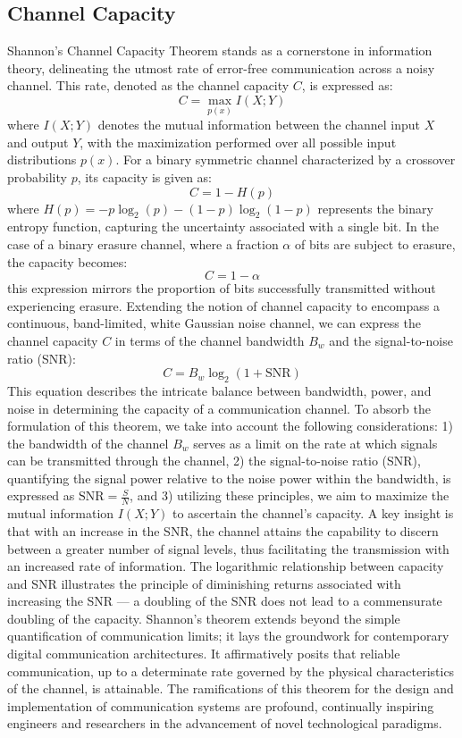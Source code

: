 \documentclass[journal,12pt,onecolumn,draftclsnofoot,]{IEEEtran}
\begin{document}
	\subsection{Channel Capacity}
	Shannon's Channel Capacity Theorem stands as a cornerstone in information theory, delineating the utmost rate of error-free communication across a noisy channel. This rate, denoted as the channel capacity \(C\), is expressed as:
	\[ C = \max_{p(x)} I(X; Y) \]
	where \(I(X; Y)\) denotes the mutual information between the channel input \(X\) and output \(Y\), with the maximization performed over all possible input distributions \(p(x)\). For a binary symmetric channel characterized by a crossover probability \(p\), its capacity is given as:
	\[ C = 1 - H(p) \]
	where \(H(p) = -p \log_2(p) - (1-p) \log_2(1-p)\) represents the binary entropy function, capturing the uncertainty associated with a single bit. In the case of a binary erasure channel, where a fraction \(\alpha\) of bits are subject to erasure, the capacity becomes:
	\[ C = 1 - \alpha \]
	this expression mirrors the proportion of bits successfully transmitted without experiencing erasure. Extending the notion of channel capacity to encompass a continuous, band-limited, white Gaussian noise channel, we can express the channel capacity \(C\) in terms of the channel bandwidth \(B_w\) and the signal-to-noise ratio (SNR):
	\[ C = B_w \log_2 (1 + \text{SNR}) \]
	This equation describes the intricate balance between bandwidth, power, and noise in determining the capacity of a communication channel. To absorb the formulation of this theorem, we take into account the following considerations: 1) the bandwidth of the channel \(B_w\) serves as a limit on the rate at which signals can be transmitted through the channel, 2) the signal-to-noise ratio (SNR), quantifying the signal power relative to the noise power within the bandwidth, is expressed as \(\text{SNR} = \frac{S}{N}\), and 3) utilizing these principles, we aim to maximize the mutual information \(I(X; Y)\) to ascertain the channel's capacity.  A key insight  is that with an increase in the SNR, the channel attains the capability to discern between a greater number of signal levels, thus facilitating the transmission with an increased rate of information. The logarithmic relationship between capacity and SNR illustrates the principle of diminishing returns associated with increasing the SNR — a doubling of the SNR does not lead to a commensurate doubling of the capacity. Shannon's theorem extends beyond the simple quantification of communication limits; it lays the groundwork for contemporary digital communication architectures. It affirmatively posits that reliable communication, up to a determinate rate governed by the physical characteristics of the channel, is attainable. The ramifications of this theorem for the design and implementation of communication systems are profound, continually inspiring engineers and researchers in the advancement of novel technological paradigms.
	
\end{document}
